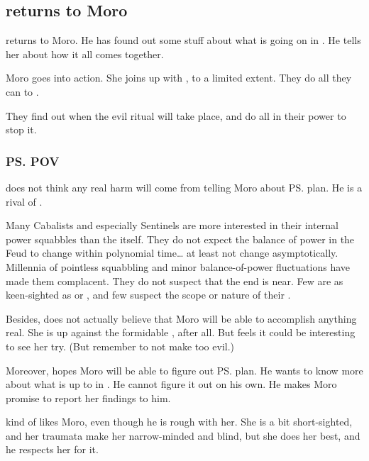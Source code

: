 \subsection{\Nasshikerr returns to Moro}
 returns to Moro. 
He has found out some stuff about what is going on in \Malcur. 
He tells her about how it all comes together. 

Moro goes into action. 
She joins up with \Tiroco, to a limited extent. 
They do all they can to . 

They find out when the evil ritual will take place, and do all in their power to stop it. 





\subsubsection{\ps{\Nasshikerr} POV}
\Nasshikerr{} does not think any real harm will come from telling Moro about \ps{\Secherdamon} plan. 
He is a rival of \Secherdamon. 

Many Cabalists and especially Sentinels are more interested in their internal power squabbles than the  itself. 
They do not expect the balance of power in the Feud to change within polynomial time\ldots{} at least not change asymptotically. 
Millennia of pointless squabbling and minor balance-of-power fluctuations have made them complacent. 
They do not suspect that the end is near. 
Few are as keen-sighted as \Secherdamon{} or \Azraid, and few suspect the scope or nature of their . 

Besides, \Nasshikerr{} does not actually believe that Moro will be able to accomplish anything real. 
She is up against the formidable , after all. 
But \Nasshikerr{} feels it could be interesting to see her try. 
(But remember to not make \Nasshikerr{} too evil.) 

Moreover, \Nasshikerr{} hopes Moro will be able to figure out \ps{\Secherdamon} plan. 
He wants to know more about what \Secherdamon{} is up to in \Malcur. 
He cannot figure it out on his own. 
He makes Moro promise to report her findings to him. 

\Nasshikerr{} kind of likes Moro, even though he is rough with her. 
She is a bit short-sighted, and her traumata make her narrow-minded and blind, but she does her best, and he respects her for it. 





